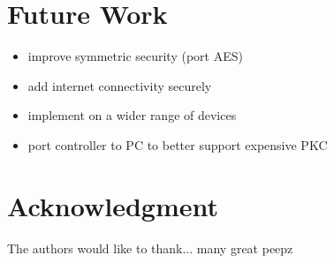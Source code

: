\documentclass[conference]{./sty/IEEEtran}
\begin{document}
\section{Future Work} %
\label{sec:future_work}

\begin{itemize}
  \item improve symmetric security (port AES)
  \item add internet connectivity securely
  \item implement on a wider range of devices
  \item port controller to PC to better support expensive PKC
\end{itemize}



\section*{Acknowledgment}


The authors would like to thank... many great peepz







%
%
%






\end{document}
